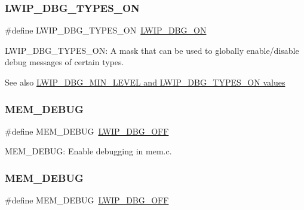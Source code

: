\subsubsection{\texorpdfstring{L\+W\+I\+P\+\_\+\+D\+B\+G\+\_\+\+T\+Y\+P\+E\+S\+\_\+\+ON}{LWIP\_DBG\_TYPES\_ON}\hspace{0.1cm}{\footnotesize\ttfamily [2/2]}}
{\footnotesize\ttfamily \#define L\+W\+I\+P\+\_\+\+D\+B\+G\+\_\+\+T\+Y\+P\+E\+S\+\_\+\+ON~\hyperlink{group__debugging__levels_ga9e31b7cbbc8f46af8e62b548079acd4e}{L\+W\+I\+P\+\_\+\+D\+B\+G\+\_\+\+ON}}

L\+W\+I\+P\+\_\+\+D\+B\+G\+\_\+\+T\+Y\+P\+E\+S\+\_\+\+ON\+: A mask that can be used to globally enable/disable debug messages of certain types. \begin{DoxySeeAlso}{See also}
\hyperlink{group__debugging__levels}{L\+W\+I\+P\+\_\+\+D\+B\+G\+\_\+\+M\+I\+N\+\_\+\+L\+E\+V\+E\+L and L\+W\+I\+P\+\_\+\+D\+B\+G\+\_\+\+T\+Y\+P\+E\+S\+\_\+\+O\+N values} 
\end{DoxySeeAlso}
\mbox{\label{group__lwip__opts__debugmsg_ga2d7bc380695eeedb1af50c3808613afe}} 
\subsubsection{\texorpdfstring{M\+E\+M\+\_\+\+D\+E\+B\+UG}{MEM\_DEBUG}\hspace{0.1cm}{\footnotesize\ttfamily [1/2]}}
{\footnotesize\ttfamily \#define M\+E\+M\+\_\+\+D\+E\+B\+UG~\hyperlink{group__debugging__levels_gadab1cdc3f45939a3a5c9a3d7e04987e1}{L\+W\+I\+P\+\_\+\+D\+B\+G\+\_\+\+O\+FF}}

M\+E\+M\+\_\+\+D\+E\+B\+UG\+: Enable debugging in mem.\+c. \mbox{\label{group__lwip__opts__debugmsg_ga2d7bc380695eeedb1af50c3808613afe}} 
\subsubsection{\texorpdfstring{M\+E\+M\+\_\+\+D\+E\+B\+UG}{MEM\_DEBUG}\hspace{0.1cm}{\footnotesize\ttfamily [2/2]}}
{\footnotesize\ttfamily \#define M\+E\+M\+\_\+\+D\+E\+B\+UG~\hyperlink{group__debugging__levels_gadab1cdc3f45939a3a5c9a3d7e04987e1}{L\+W\+I\+P\+\_\+\+D\+B\+G\+\_\+\+O\+FF}}

